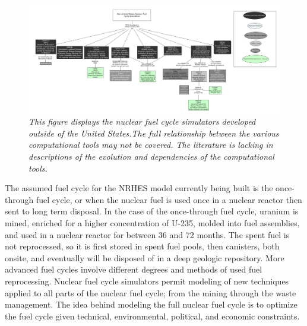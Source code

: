 \documentclass{article}                                                                           %
\begin{document}
\begin{linenumbers}
\begin{subfigures}
\begin{figure}
\includegraphics[width=\textwidth]{Non-US_FUEL_TOOLS.png}
\caption{\small \sl This figure displays the nuclear fuel cycle simulators developed outside of the United States.The full relationship between the various computational tools may not be covered.  The literature is lacking in descriptions of the evolution and dependencies of the computational tools.}
\end{figure}
\end{subfigures}

The assumed fuel cycle for the NRHES model currently being built is the once-through fuel cycle, or when the nuclear fuel is used once in a nuclear reactor then sent to long term disposal. In the case of the once-through fuel cycle, uranium is mined, enriched for a higher concentration of U-235, molded into fuel assemblies, and used in a nuclear reactor for between 36 and 72 months. The spent fuel is not reprocessed, so it is first stored in spent fuel pools, then canisters, both onsite, and eventually will be disposed of in a deep geologic repository. More advanced fuel cycles involve different degrees and methods of used fuel reprocessing. Nuclear fuel cycle simulators permit modeling of new techniques applied to all parts of the nuclear fuel cycle; from the mining through the waste management. The idea behind modeling the full nuclear fuel cycle is to optimize the fuel cycle given technical, environmental, political, and economic constraints.


\end{linenumbers}
\end{document}
